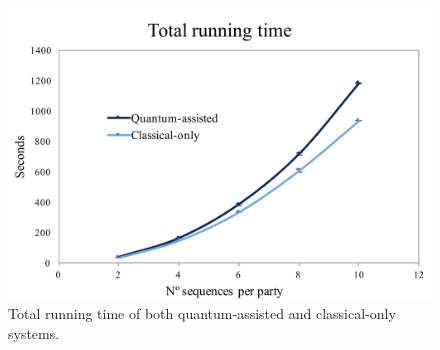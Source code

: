 %

\begin{figure}
    \centering
    \includegraphics[scale=0.8]{Chapter_PrivatePhylogeneticTrees/total_running.png}
    \caption{Total running time of both quantum-assisted and classical-only systems.}
    \label{fig:total_running_time}
\end{figure}

